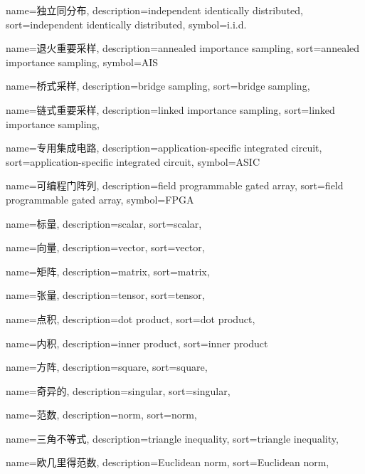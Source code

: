 {
  name=独立同分布,
  description={independent identically distributed},
  sort={independent identically distributed},
  symbol={i.i.d.}
}

{
  name=退火重要采样,
  description={annealed importance sampling},
  sort={annealed importance sampling},
  symbol={AIS}
}

{
  name=桥式采样,
  description={bridge sampling},
  sort={bridge sampling},
}

{
  name=链式重要采样,
  description={linked importance sampling},
  sort={linked importance sampling},
}

{
  name=专用集成电路,
  description={application-specific integrated circuit},
  sort={application-specific integrated circuit},
  symbol={ASIC}
}

{
  name=可编程门阵列,
  description={field programmable gated array},
  sort={field programmable gated array},
  symbol={FPGA}
}

{
  name=标量,
  description={scalar},
  sort={scalar},
}

{
  name=向量,
  description={vector},
  sort={vector},
}

{
  name=矩阵,
  description={matrix},
  sort={matrix},
}

{
  name=张量,
  description={tensor},
  sort={tensor},
}

{
  name=点积,
  description={dot product},
  sort={dot product},
}

{
  name=内积,
  description={inner product},
  sort={inner product}
}

{
  name=方阵,
  description={square},
  sort={square},
}

{
  name=奇异的,
  description={singular},
  sort={singular},
}

{
  name=范数,
  description={norm},
  sort={norm},
}

{
  name=三角不等式,
  description={triangle inequality},
  sort={triangle inequality},
}

{
  name=欧几里得范数,
  description={Euclidean norm},
  sort={Euclidean norm},
}

